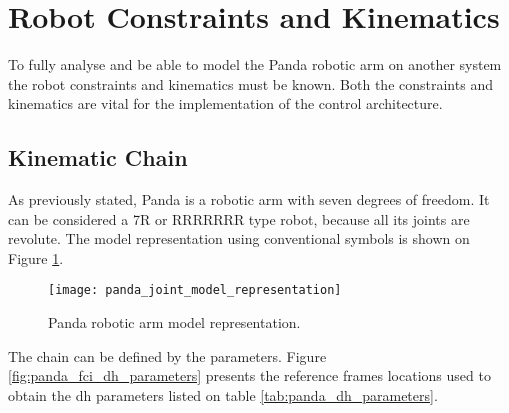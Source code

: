 


\section{Robot Constraints and Kinematics}
\label{sec:robotic_system_constraints_kinematics}

To fully analyse and be able to model the Panda robotic arm on another system the robot constraints and kinematics must be known. Both the constraints and kinematics are vital for the implementation of the control architecture.

\subsection{Kinematic Chain}
\label{robotic_system_constraints_kinematics_kinematic_chain}

As previously stated, Panda is a robotic arm with seven degrees of freedom. It can be considered a 7R or RRRRRRR type robot, because all its joints are revolute. The model representation using conventional symbols is shown on Figure \ref{fig:panda_joint_model_representation}.\\

\begin{figure}[htbp]
    \centering
	\texttt{[image: panda\_joint\_model\_representation]}
	\caption{Panda robotic arm model representation.}
	\label{fig:panda_joint_model_representation}
\end{figure}

The  chain can be defined by the  parameters. Figure \ref{fig:panda_fci_dh_parameters} presents the reference frames locations used to obtain the \gls{dh} parameters listed on table \ref{tab:panda_dh_parameters}.

